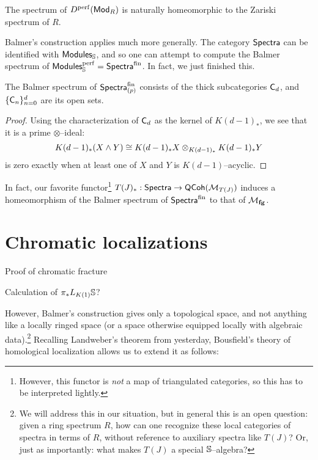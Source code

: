 \begin{theorem}[Balmer]
The spectrum of $D^{\perf}(\CatOf{Mod}_R)$ is naturally homeomorphic to the Zariski spectrum of $R$.
\end{theorem}

Balmer's construction applies much more generally.  The category $\CatOf{Spectra}$ can be identified with $\CatOf{Modules}_{\S}$, and so one can attempt to compute the Balmer spectrum of $\CatOf{Modules}_{\S}^{\perf} = \CatOf{Spectra}^{\mathrm{fin}}$.  In fact, we just finished this.
\begin{theorem}
The Balmer spectrum of $\CatOf{Spectra}_{(p)}^{\mathrm{fin}}$ consists of the thick subcategories $\CatOf C_d$, and $\{\CatOf C_n\}_{n=0}^d$ are its open sets.
\end{theorem}
\begin{proof}
Using the characterization of $\CatOf C_d$ as the kernel of $K(d-1)_*$, we see that it is a prime $\otimes$--ideal: \[K(d-1)_*(X \sm Y) \cong K(d-1)_* X \otimes_{K(d-1)_*} K(d-1)_* Y\] is zero exactly when at least one of $X$ and $Y$ is $K(d-1)$--acyclic.
\end{proof}

In fact, our favorite functor\footnote{However, this functor is \emph{not} a map of triangulated categories, so this has to be interpreted lightly.} $T(J)_*: \CatOf{Spectra} \to \CatOf{QCoh}(\M_{T(J)})$ induces a homeomorphism of the Balmer spectrum of $\CatOf{Spectra}^{\mathrm{fin}}$ to that of $\moduli{fg}$.








\section{Chromatic localizations}

Proof of chromatic fracture

Calculation of $\pi_* L_{K(1)} \S$?


However, Balmer's construction gives only a topological space, and not anything like a locally ringed space (or a space otherwise equipped locally with algebraic data).\footnote{We will address this in our situation, but in general this is an open question: given a ring spectrum $R$, how can one recognize these local categories of spectra in terms of $R$, without reference to auxiliary spectra like $T(J)$?  Or, just as importantly: what makes $T(J)$ a special $\S$--algebra?}  Recalling Landweber's theorem from yesterday, Bousfield's theory of homological localization allows us to extend it as follows:

